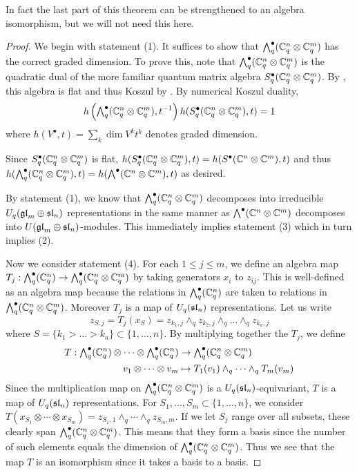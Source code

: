 \documentclass[11pt]{amsart}
\begin{document}
In fact the last part of this theorem can be strengthened to an algebra isomorphism, but we will not need this here.

\begin{proof}
We begin with statement (1). It suffices to show that $ \Alt{\bullet}{q}(\bC_q^n \otimes \bC_q^m) $   has the correct graded dimension.  To prove this, note that $\Alt{\bullet}{q}(\bC_q^n \otimes \bC_q^m) $ is the quadratic dual of the more familiar quantum matrix algebra $ S_q^\bullet (\bC_q^n \otimes \bC_q^m) $.  By \cite[Prop. 2.38]{BZ}, this algebra is flat and thus Koszul by \cite[Prop. 2.33]{BZ}. By numerical Koszul duality,
$$ h\left(\Alt{\bullet}{q}( \bC_q^n \otimes \bC_q^m), t^{-1}\right) h(S^\bullet_q (\bC_q^n \otimes \bC_q^m), t) = 1 $$ 
where $ h(V^\bullet, t) = \sum_k \dim V^k t^k $ denotes graded dimension.
    
Since $ S^\bullet_q (\bC_q^n \otimes \bC_q^m) $ is flat, $ h(S^\bullet_q (\bC_q^n \otimes \bC_q^m), t) =  h(S^\bullet (\bC^n \otimes \bC^m), t) $ and thus  $ h(\Alt{\bullet}{q} (\bC_q^n \otimes \bC_q^m), t) =  h(\Alt{\bullet}{} (\bC^n \otimes \bC^m), t)$ as desired.
    
By statement (1), we know that $ \Alt{\bullet}{q}(\bC_q^n \otimes \bC_q^m) $ decomposes into irreducible $ U_q(\gl_m \oplus \sl_n) $ representations in the same manner as $ \Alt{\bullet}{}(\bC^n \otimes \bC^m) $ decomposes into $ U(\gl_m \oplus \sl_n)$-modules. This immediately implies statement (3) which in turn implies (2).

Now we consider statement (4). For each $ 1 \le j \le m$, we define an algebra map $T_j : \Alt{\bullet}{q}(\bC_q^n) \rightarrow \Alt{\bullet}{q} (\bC_q^n \otimes \bC_q^m) $ by taking generators $ x_i $ to $z_{ij}$.  This is well-defined as an algebra map because the relations in $ \Alt{\bullet}{q}(\bC_q^n) $ are taken to relations in $\Alt{\bullet}{q} (\bC_q^n \otimes \bC_q^m)$.  Moreover $T_j $ is a map of $ U_q(\sl_n) $ representations.  Let us write 
$$z_{S,j} = T_j(x_S) = z_{k_1,j} \wedge_q z_{k_2,j} \wedge_q \dots \wedge_q z_{k_a,j}$$ 
where $ S = \{k_1 > \dots > k_a \} \subset \{ 1, \dots, n \} $. By multiplying together the $ T_j $, we define
\begin{align*}
T : \Alt{\bullet}{q}(\bC_q^n) \otimes \cdots \otimes \Alt{\bullet}{q}(\bC_q^n) &\rightarrow \Alt{\bullet}{q} (\bC_q^n \otimes \bC_q^m) \\
v_1 \otimes \cdots \otimes v_m &\mapsto T_1(v_1) \wedge_q \cdots \wedge_q T_m(v_m)
\end{align*}
Since the multiplication map on $\Alt{\bullet}{q} (\bC_q^n \otimes \bC_q^m)  $ is a $U_q(\sl_n)$-equivariant, $ T $ is a map of $ U_q(\sl_n) $ representations. For $ S_1, \dots, S_m \subset \{1, \dots, n \} $, we consider $ T(x_{S_1} \otimes \cdots \otimes x_{S_m}) = z_{S_1,1} \wedge_q \cdots \wedge_q z_{S_m,m}$. If we let $ S_j $ range over all subsets, these clearly span $ \Alt{\bullet}{q} (\bC_q^n \otimes \bC_q^m) $.  This means that they form a basis since the number of such elements equals the dimension of $ \Alt{\bullet}{q} (\bC_q^n \otimes \bC_q^m) $.  Thus we see that the map $ T $ is an isomorphism since it takes a basis to a basis. 
\end{proof}
\end{document}
